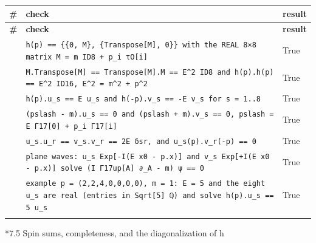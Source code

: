 \documentclass[10pt,a4paper]{article}
\makeatletter
\renewcommand\subsubsection{\@startsection{subsubsection}{3}{\z@}{-3.25ex\@plus -1ex \@minus -.2ex}{1.5ex \@plus .2ex}{\normalfont\normalsize\bfseries\raggedright}}
\makeatother
\begin{document}
{\footnotesize
\begin{longtable}{>{\raggedright\arraybackslash}p{}>{\raggedright\arraybackslash}p{}>{\raggedright\arraybackslash}p{}}
\toprule
\textbf{\#} & \textbf{check} & \textbf{result} \\
\midrule\endfirsthead
\toprule
\textbf{\#} & \textbf{check} & \textbf{result} \\
\midrule\endhead
\endfoot
\bottomrule\endlastfoot
8 & \texttt{h(p) == \{\{0, M\}, \{Transpose[M], 0\}\} with the REAL 8×8 matrix M = m ID8 + p\_\allowbreak{}i τO[i]} & True \\
9 & \texttt{M.Transpose[M] == Transpose[M].M == E\textasciicircum{}2 ID8 and h(p).h(p) == E\textasciicircum{}2 ID16, E\textasciicircum{}2 = m\textasciicircum{}2 + p\textasciicircum{}2} & True \\
10 & \texttt{h(p).u\_\allowbreak{}s == E u\_\allowbreak{}s and h(-p).v\_\allowbreak{}s == -E v\_\allowbreak{}s for s = 1..8} & True \\
11 & \texttt{(pslash - m).u\_\allowbreak{}s == 0 and (pslash + m).v\_\allowbreak{}s == 0, pslash = E Γ17[0] + p\_\allowbreak{}i Γ17[i]} & True \\
12 & \texttt{u\_\allowbreak{}s.u\_\allowbreak{}r == v\_\allowbreak{}s.v\_\allowbreak{}r == 2E δsr, and u\_\allowbreak{}s(p).v\_\allowbreak{}r(-p) == 0} & True \\
13 & \texttt{plane waves: u\_\allowbreak{}s Exp[-I(E x0 - p.x)] and v\_\allowbreak{}s Exp[+I(E x0 - p.x)] solve (I Γ17up[A] ∂\_\allowbreak{}A - m) ψ == 0} & True \\
14 & \texttt{example p = (2,2,4,0,0,0,0), m = 1: E = 5 and the eight u\_\allowbreak{}s are real (entries in Sqrt[5] ℚ) and solve h(p).u\_\allowbreak{}s == 5 u\_\allowbreak{}s} & True \\*
\end{longtable}}
\subsubsection*{7.5 Spin sums, completeness, and the diagonalization of h}
\end{document}
